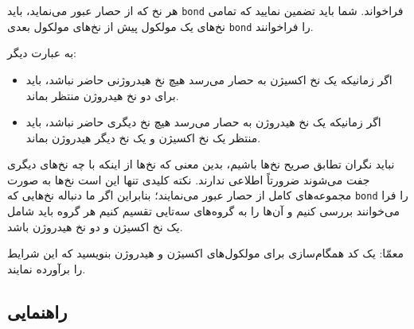 \documentclass{book}
\newcommand{\clearemptydoublepage}{\newpage\cleardoublepage}
\begin{document}
    هر نخ که از حصار عبور می‌نماید، باید {\tt bond} فراخواند. شما باید تضمین نمایید که تمامی نخ‌های یک مولکول پیش از نخ‌های مولکول بعدی {\tt bond} 
    را فراخوانند. 


    به عبارت دیگر: 

\begin{itemize}

\item
    اگر زمانیکه یک نخ اکسیژن به حصار می‌رسد هیچ نخ‌ هیدروژنی حاضر نباشد، باید برای دو نخ هیدروژن منتظر بماند. 

\item 
    اگر زمانیکه یک نخ هیدروژن به حصار می‌رسد هیچ نخ دیگری حاضر نباشد، باید منتظر یک نخ  اکسیژن و یک نخ دیگر هیدروژن بماند. 
\end{itemize}

    نباید نگران تطابق صریح نخ‌ها باشیم،‌ بدین معنی که نخ‌ها  از اینکه با چه نخ‌های دیگری جفت می‌شوند ضرورتاً  اطلاعی ندارند. نکته کلیدی تنها این است 
    نخ‌ها به صورت مجموعه‌های کامل از حصار عبور می‌نمایند؛ بنابراین اگر ما دنباله نخ‌هایی که {\tt bond} را فرا می‌خوانند بررسی کنیم و آن‌ها را به گروه‌های 
    سه‌تایی تقسیم کنیم هر گروه باید شامل یک نخ اکسیژن و دو نخ هیدروژن باشد. 

    معمّا:‌ یک کد همگام‌سازی برای مولکول‌های اکسیژن و هیدروژن بنویسید که این شرایط را برآورده نمایند. 


\clearemptydoublepage
\subsection {راهنمایی }
\end{document}
